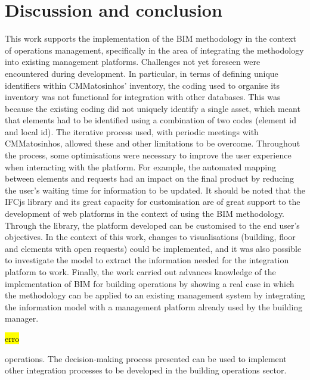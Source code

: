 \section{Discussion and conclusion}
\label{sec:conclusion}

This work supports the implementation of the BIM methodology in the context of operations management, specifically in the area of integrating the methodology into existing management platforms. Challenges not yet foreseen were encountered during development. In particular, in terms of defining unique identifiers within CMMatosinhos' inventory, the coding used to organise its inventory was not functional for integration with other databases. This was because the existing coding did not uniquely identify a single asset, which meant that elements had to be identified using a combination of two codes (element id and local id). The iterative process used, with periodic meetings with CMMatosinhos, allowed these and other limitations to be overcome. Throughout the process, some optimisations were necessary to improve the user experience when interacting with the platform. For example, the automated mapping between elements and requests had an impact on the final product by reducing the user's waiting time for information to be updated. It should be noted that the IFCjs library and its great capacity for customisation are of great support to the development of web platforms in the context of using the BIM methodology. Through the library, the platform developed can be customised to the end user's objectives. In the context of this work, changes to visualisations (building, floor and elements with open requests) could be implemented, and it was also possible to investigate the model to extract the information needed for the integration platform to work. Finally, the work carried out advances knowledge of the implementation of BIM for building operations by showing a real case in which the methodology can be applied to an existing management system by integrating the information model with a management platform already used by the building manager.

\hl{erro}

operations. The decision-making process presented can be used to implement other integration processes to be developed in the building operations sector.

